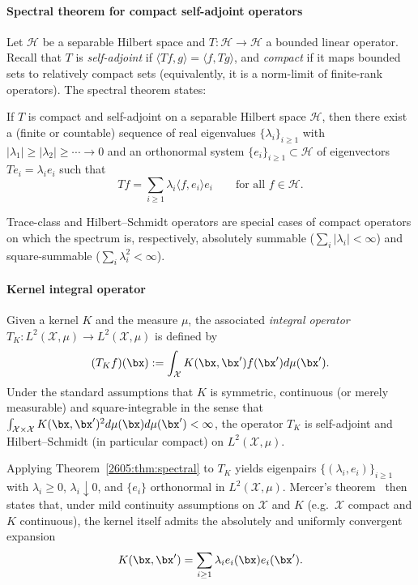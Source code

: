   \paragraph{Spectral theorem for compact self-adjoint operators}
  Let $\mathcal{H}$ be a separable Hilbert space and $T:\mathcal{H}\to\mathcal{H}$ a bounded linear operator. Recall that $T$ is \emph{self-adjoint} if $\langle Tf,g\rangle=\langle f,Tg\rangle$, and \emph{compact} if it maps bounded sets to relatively compact sets (equivalently, it is a norm-limit of finite-rank operators). The spectral theorem states:
  \begin{theorem}\label{2605:thm:spectral}
  If $T$ is compact and self-adjoint on a separable Hilbert space $\mathcal{H}$, then there exist a (finite or countable) sequence of real eigenvalues $\{\lambda_i\}_{i\geq 1}$ with $|\lambda_1|\geq|\lambda_2|\geq\cdots\to 0$ and an orthonormal system $\{e_i\}_{i\geq 1}\subset\mathcal{H}$ of eigenvectors $Te_i=\lambda_i e_i$ such that
  \begin{equation}\label{2605:eq:spectral}
    T f  =  \sum_{i\geq 1} \lambda_i \langle f,e_i\rangle e_i\qquad\text{for all }f\in\mathcal{H}.
    \end{equation}
    \end{theorem}
  Trace-class and Hilbert--Schmidt operators are special cases of compact operators on which the spectrum is, respectively, absolutely summable ($\sum_i|\lambda_i|<\infty$) and square-summable ($\sum_i\lambda_i^2<\infty$).

    \paragraph{Kernel integral operator}
    Given a kernel $K$ and the measure $\mu$, the associated \emph{integral operator} $T_K:L^2(\mathcal{X},\mu)\to L^2(\mathcal{X},\mu)$ is defined by
    \begin{equation}\label{2605:eq:integral-op}
      (T_K f)(\bx) := \int_{\mathcal{X}} K(\bx,\bx') f(\bx') d\mu(\bx').
      \end{equation}
      Under the standard assumptions that $K$ is symmetric, continuous (or merely measurable) and square-integrable in the sense that $\int_{\mathcal{X}\times\mathcal{X}} K(\bx,\bx')^2 d\mu(\bx)d\mu(\bx')<\infty$, the operator $T_K$ is self-adjoint and Hilbert--Schmidt (in particular compact) on $L^2(\mathcal{X},\mu)$.

      Applying Theorem~\ref{2605:thm:spectral} to $T_K$ yields eigenpairs $\{(\lambda_i,e_i)\}_{i\geq 1}$ with $\lambda_i\geq 0$, $\lambda_i\downarrow 0$, and $\{e_i\}$ orthonormal in $L^2(\mathcal{X},\mu)$. Mercer's theorem~\cite{mercer1909functions} then states that, under mild continuity assumptions on $\mathcal{X}$ and $K$ (e.g.\ $\mathcal{X}$ compact and $K$ continuous), the kernel itself admits the absolutely and uniformly convergent expansion
      \begin{equation}\label{2605:eq:mercer}
        K(\bx,\bx') = \sum_{i\geq 1}\lambda_i e_i(\bx) e_i(\bx').
        \end{equation}

